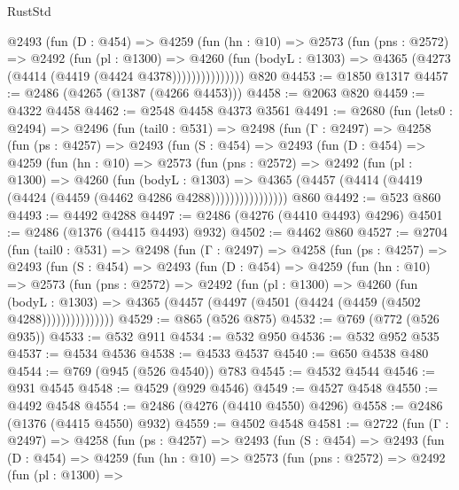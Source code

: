 \begin{lexlean}{RustStd}
\begin{coremodule}
              @2493
                (fun (D : @454) =>
                @4259
                  (fun (hn : @10) =>
                  @2573
                    (fun (pns : @2572) =>
                    @2492
                      (fun (pl : @1300) =>
                      @4260
                        (fun (bodyL : @1303) =>
                        @4365 (@4273 (@4414 (@4419 (@4424 @4378)))))))))))))))
    @820
@4453 := @1850 @1317
@4457 := @2486 (@4265 (@1387 (@4266 @4453)))
@4458 := @2063 @820
@4459 := @4322 @4458
@4462 := @2548 @4458 @4373 @3561
@4491 := @2680
    (fun (lets0 : @2494) =>
    @2496
      (fun (tail0 : @531) =>
      @2498
        (fun (Γ : @2497) =>
        @4258
          (fun (ps : @4257) =>
          @2493
            (fun (S : @454) =>
            @2493
              (fun (D : @454) =>
              @4259
                (fun (hn : @10) =>
                @2573
                  (fun (pns : @2572) =>
                  @2492
                    (fun (pl : @1300) =>
                    @4260
                      (fun (bodyL : @1303) =>
                      @4365 (@4457 (@4414 (@4419 (@4424 (@4459 (@4462 @4286 @4288))))))))))))))))
    @860
@4492 := @523 @860
@4493 := @4492 @4288
@4497 := @2486 (@4276 (@4410 @4493) @4296)
@4501 := @2486 (@1376 (@4415 @4493) @932)
@4502 := @4462 @860
@4527 := @2704
    (fun (tail0 : @531) =>
    @2498
      (fun (Γ : @2497) =>
      @4258
        (fun (ps : @4257) =>
        @2493
          (fun (S : @454) =>
          @2493
            (fun (D : @454) =>
            @4259
              (fun (hn : @10) =>
              @2573
                (fun (pns : @2572) =>
                @2492
                  (fun (pl : @1300) =>
                  @4260
                    (fun (bodyL : @1303) =>
                    @4365 (@4457 (@4497 (@4501 (@4424 (@4459 (@4502 @4288)))))))))))))))
@4529 := @865 (@526 @875)
@4532 := @769 (@772 (@526 @935))
@4533 := @532 @911
@4534 := @532 @950
@4536 := @532 @952 @535
@4537 := @4534 @4536
@4538 := @4533 @4537
@4540 := @650 @4538 @480
@4544 := @769 (@945 (@526 @4540)) @783
@4545 := @4532 @4544
@4546 := @931 @4545
@4548 := @4529 (@929 @4546)
@4549 := @4527 @4548
@4550 := @4492 @4548
@4554 := @2486 (@4276 (@4410 @4550) @4296)
@4558 := @2486 (@1376 (@4415 @4550) @932)
@4559 := @4502 @4548
@4581 := @2722
    (fun (Γ : @2497) =>
    @4258
      (fun (ps : @4257) =>
      @2493
        (fun (S : @454) =>
        @2493
          (fun (D : @454) =>
          @4259
            (fun (hn : @10) =>
            @2573
              (fun (pns : @2572) =>
              @2492
                (fun (pl : @1300) =>

\end{coremodule}
\end{lexlean}
